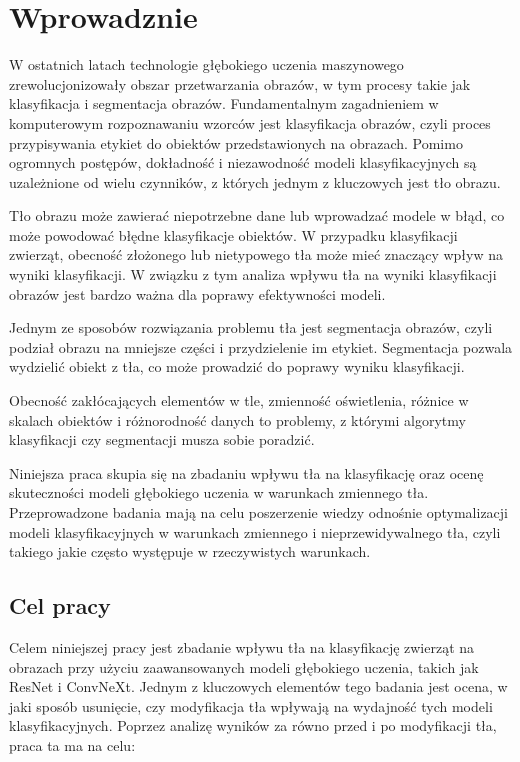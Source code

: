 
\chapter*{Wprowadznie}

W ostatnich latach technologie głębokiego uczenia maszynowego zrewolucjonizowały obszar przetwarzania obrazów, w tym procesy takie jak klasyfikacja i segmentacja obrazów. Fundamentalnym zagadnieniem w komputerowym rozpoznawaniu wzorców 
jest klasyfikacja obrazów, czyli proces przypisywania etykiet do obiektów przedstawionych na obrazach. Pomimo ogromnych postępów, dokładność i niezawodność modeli klasyfikacyjnych są uzależnione od wielu czynników, z których jednym z 
kluczowych jest tło obrazu.

Tło obrazu może zawierać niepotrzebne dane lub wprowadzać modele w błąd, co może powodować błędne klasyfikacje obiektów. W przypadku klasyfikacji zwierząt, obecność złożonego lub nietypowego tła może mieć znaczący wpływ na wyniki klasyfikacji. 
W związku z tym analiza wpływu tła na wyniki klasyfikacji obrazów jest bardzo ważna dla poprawy efektywności modeli.

Jednym ze sposobów rozwiązania problemu tła jest segmentacja obrazów, czyli podział obrazu na mniejsze części i przydzielenie im etykiet. Segmentacja pozwala wydzielić obiekt z tła, co może prowadzić do poprawy wyniku klasyfikacji.

Obecność zakłócających elementów w tle, zmienność oświetlenia, różnice w skalach obiektów i różnorodność danych to problemy, z którymi algorytmy klasyfikacji czy segmentacji musza sobie poradzić.  

Niniejsza praca skupia się na zbadaniu wpływu tła na klasyfikację oraz ocenę skuteczności modeli głębokiego uczenia w warunkach zmiennego tła. Przeprowadzone badania mają na celu poszerzenie wiedzy odnośnie optymalizacji modeli klasyfikacyjnych
w warunkach zmiennego i nieprzewidywalnego tła, czyli takiego jakie często występuje w rzeczywistych warunkach.

\section*{Cel pracy}

Celem niniejszej pracy jest zbadanie wpływu tła na klasyfikację zwierząt na obrazach przy użyciu zaawansowanych modeli głębokiego uczenia, takich jak ResNet i ConvNeXt. Jednym z kluczowych elementów tego badania jest ocena, w jaki sposób 
usunięcie, czy modyfikacja tła wpływają na wydajność tych modeli klasyfikacyjnych. Poprzez analizę wyników za równo przed i po modyfikacji tła, praca ta ma na celu:

